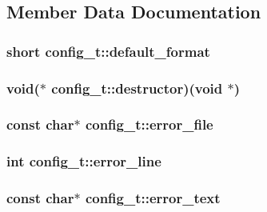 \subsection{Member Data Documentation}
\hypertarget{structconfig__t_aef80ce4b7772667e6615a19633ce0a65}{
\subsubsection[{default\-\_\-format}]{\setlength{\rightskip}{0pt plus 5cm}short config\-\_\-t\-::default\-\_\-format}}\label{structconfig__t_aef80ce4b7772667e6615a19633ce0a65}
\hypertarget{structconfig__t_a2d05a50f18015afcd6b4b2a1a97e678c}{
\subsubsection[{destructor}]{\setlength{\rightskip}{0pt plus 5cm}void($\ast$ config\-\_\-t\-::destructor)(void $\ast$)}}\label{structconfig__t_a2d05a50f18015afcd6b4b2a1a97e678c}
\hypertarget{structconfig__t_a244b41324f8458377c6aff4c5caa966f}{
\subsubsection[{error\-\_\-file}]{\setlength{\rightskip}{0pt plus 5cm}const char$\ast$ config\-\_\-t\-::error\-\_\-file}}\label{structconfig__t_a244b41324f8458377c6aff4c5caa966f}
\hypertarget{structconfig__t_a4c437bd0d5063aaf27f68cb84bba8616}{
\subsubsection[{error\-\_\-line}]{\setlength{\rightskip}{0pt plus 5cm}int config\-\_\-t\-::error\-\_\-line}}\label{structconfig__t_a4c437bd0d5063aaf27f68cb84bba8616}
\hypertarget{structconfig__t_ab1af593275e4d341c8cc455a9e84588d}{
\subsubsection[{error\-\_\-text}]{\setlength{\rightskip}{0pt plus 5cm}const char$\ast$ config\-\_\-t\-::error\-\_\-text}}\label{structconfig__t_ab1af593275e4d341c8cc455a9e84588d}
